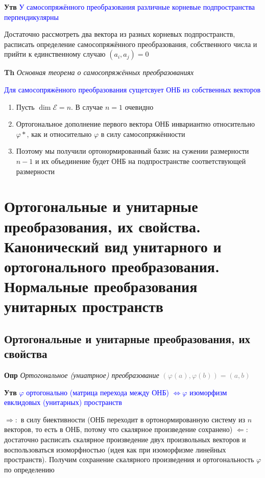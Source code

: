 \documentclass[a4paper, 14pt]{article}
\begin{document}
    \textbf{Утв} \textcolor{blue}{У самосопряжённого преобразования различные корневые подпространства перпендикулярны}
    
    Достаточно рассмотреть два вектора из разных корневых подпространств, расписать определение самосопряжённого
    преобразования, собственного числа и прийти к единственному случаю $(a_i, a_j) = 0$
    
    \textbf{Th} \textit{Основная теорема о самосопряжённых преобразованиях}
    
    \textcolor{blue}{Для самосопряжённого преобразования сущетсвует ОНБ из собственных векторов}
    
    \begin{enumerate}
        \item Пусть $\dim \mathscr{E} = n$.
        В случае $n = 1$ очевидно
        \item Ортогональное дополнение первого вектора ОНБ инвариантно относительно $\varphi*$, как и относительно $\varphi$ в
        силу самосопряжённости
        \item Поэтому мы получили ортонормированный базис на сужении размерности $n - 1$ и их объединение будет ОНБ на
        подпространстве соответствующей размерности
    \end{enumerate}
    
    \section{Ортогональные и унитарные преобразования, их свойства.
    Канонический вид унитарного и ортогонального преобразования.
    Нормальные преобразования унитарных пространств}
    
    \subsection{Ортогональные и унитарные преобразования, их свойства}
    
    \textbf{Опр} \textit{Ортогональное (униатрное) преобразование} \textcolor{gray}{$(\varphi (a), \varphi (b)) = (a, b)$}
    
    \textbf{Утв} \textcolor{blue}{$\varphi$ ортогонально (матрица перехода между ОНБ) $\Leftrightarrow \varphi$
        изоморфизм евклидовых (унитарных) пространств}
    
    $\Rightarrow:$ в силу биективности (ОНБ переходит в ортонормированную систему из $n$ векторов, то есть в ОНБ,
    потому что скалярное произведение сохранено)
    $\Leftarrow:$ достаточно расписать скалярное произведение двух произвольных векторов и воспользоваться
    изоморфностью (идея как при изоморфизме линейных пространств).
    Получим сохранение скалярного произведения и ортогональность $\varphi$ по определению
    
\end{document}
